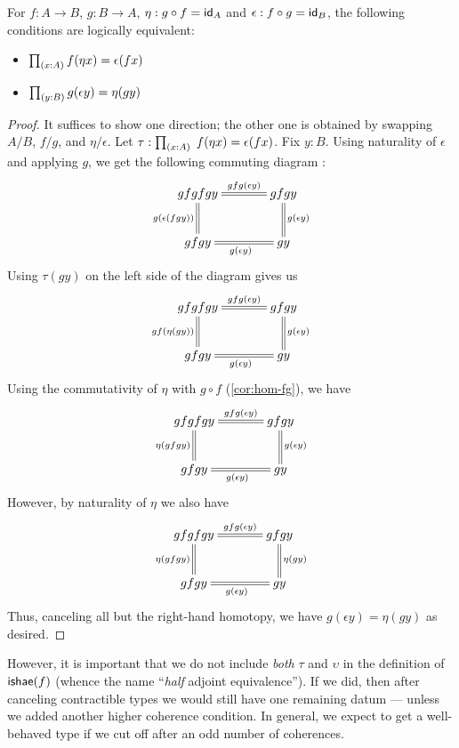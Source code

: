 \begin{lem}\label{lem:coh-equiv}
For $f : A \to B$, $g:B\to A$, $\eta: g \circ f = \idfunc[A]$ and $\epsilon:f \circ g = \idfunc[B]$, the following conditions are logically equivalent:
\begin{itemize}
\item $\prd{x:A} \map{f}{\eta x} = \epsilon(fx)$
\item $\prd{y:B} \map{g}{\epsilon y} = \eta(gy)$
\end{itemize}
\end{lem}
\begin{proof}
  It suffices to show one direction; the other one is obtained by swapping $A/B$, $f/g$, and $\eta/\epsilon$.
  Let $\tau : \prd{x:A}\;\map{f}{\eta x} = \epsilon(fx)$.
  Fix $y : B$.
  Using naturality of $\epsilon$ and applying $g$, we get the following commuting diagram :
\[\uppercurveobject{{ }}\lowercurveobject{{ }}\twocellhead{{ }}
  \xymatrix@C=3pc{gfgfgy \ar@{=}^-{gfg(\epsilon y)}[r] \ar@{=}_{g(\epsilon (fgy))}[d] & gfgy \ar@{=}^{g(\epsilon y)}[d] \\ gfgy \ar@{=}_{g(\epsilon y)}[r] & gy
  }\]
Using $\tau(gy)$ on the left side of the diagram gives us
\[\uppercurveobject{{ }}\lowercurveobject{{ }}\twocellhead{{ }}
  \xymatrix@C=3pc{gfgfgy \ar@{=}^-{gfg(\epsilon y)}[r] \ar@{=}_{gf(\eta (gy))}[d] & gfgy \ar@{=}^{g(\epsilon y)}[d] \\ gfgy \ar@{=}_{g(\epsilon y)}[r] & gy
  }\]
Using the commutativity of $\eta$ with $g \circ f$ (\autoref{cor:hom-fg}), we have
\[\uppercurveobject{{ }}\lowercurveobject{{ }}\twocellhead{{ }}
  \xymatrix@C=3pc{gfgfgy \ar@{=}^-{gfg(\epsilon y)}[r] \ar@{=}_{\eta (gfgy)}[d] & gfgy \ar@{=}^{g(\epsilon y)}[d] \\ gfgy \ar@{=}_{g(\epsilon y)}[r] & gy
  }\]
However, by naturality of $\eta$ we also have
\[\uppercurveobject{{ }}\lowercurveobject{{ }}\twocellhead{{ }}
  \xymatrix@C=3pc{gfgfgy \ar@{=}^-{gfg(\epsilon y)}[r] \ar@{=}_{\eta (gfgy)}[d] & gfgy \ar@{=}^{\eta(gy)}[d] \\ gfgy \ar@{=}_{g(\epsilon y)}[r] & gy 
  }\]
Thus, canceling all but the right-hand homotopy, we have $g(\epsilon y) = \eta(g y)$ as desired.
\end{proof}

However, it is important that we do not include \emph{both} $\tau$ and $\upsilon$ in the definition of $\ishae (f)$ (whence the name ``\emph{half} adjoint equivalence'').
If we did, then after canceling contractible types we would still have one remaining datum --- unless we added another higher coherence condition.
In general, we expect to get a well-behaved type if we cut off after an odd number of coherences.

